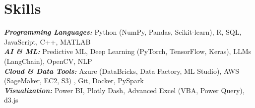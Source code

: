 \documentclass[letter paper,11pt]{article}
\makeatletter
\newcommand{\resumeItem}[1]{
\justifying
\vspace{-2.4px}
  \item\small{
    {#1}
  }
}
\newcommand{\resumeSubheading}[5]{%
  \item
    \begin{tabular*}
    {1\textwidth}
    {l@{\extracolsep{\fill}}r}
      \textbf{#1} & \small#2 \\
      {\small#3} & {\small #4} \\
      {\small#5}
    \end{tabular*}%
  \vspace{-0.95cm}
}
\newcommand{\resumeSubHeadingListStart}{\begin{itemize}[leftmargin=0.0in, label={}]}
\newcommand{\resumeItemListStart}{\vspace{1pt}\begin{itemize}}
\makeatother
\begin{document}
\vspace{-26pt}
\section{\large{Skills}}
 \begin{itemize}[leftmargin=0.00in, label={}]
    \small{\item{
     \textbf{\textsl{Programming Languages:}}{ Python (NumPy, Pandas, Scikit-learn), R, SQL, JavaScript, C++, MATLAB} \\

     \textbf{\textsl{AI \& ML:}}
     { Predictive ML, Deep Learning (PyTorch, TensorFlow, Keras), LLMs (LangChain), OpenCV, NLP  } \\
     
     \textbf{\textsl{Cloud \& Data Tools:}}\small{ Azure (DataBricks, Data Factory, ML Studio), AWS (SageMaker, EC2, S3) , Git, Docker, PySpark}\\
     
     \textbf{\textsl{Visualization:}}\small{ Power BI, Plotly Dash, Advanced Excel (VBA, Power Query), d3.js} \
    }}
 \end{itemize}
 



\end{document}
